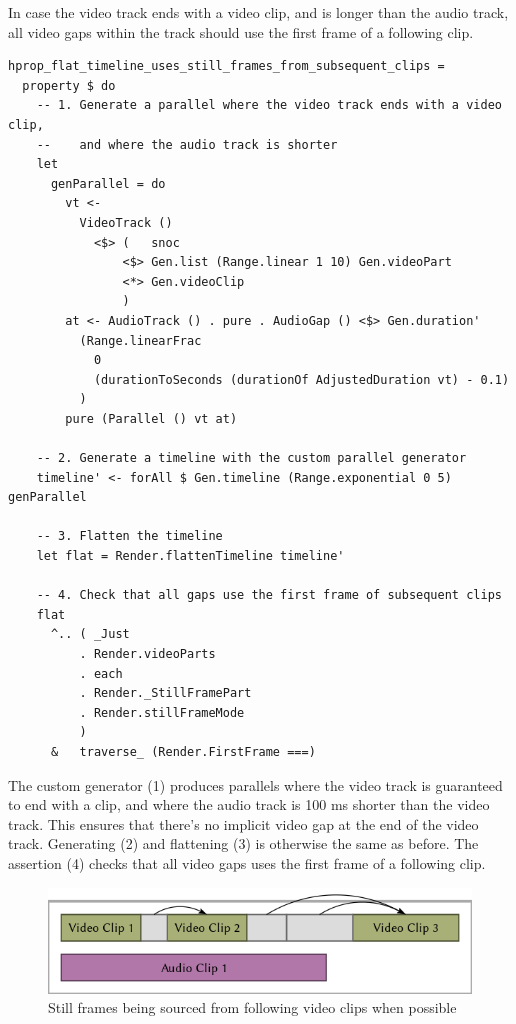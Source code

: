 In case the video track ends with a video clip, and is longer than the audio track, all video gaps within the track should use the first frame of a following clip.

\begin{verbatim}
hprop_flat_timeline_uses_still_frames_from_subsequent_clips =
  property $ do
    -- 1. Generate a parallel where the video track ends with a video clip,
    --    and where the audio track is shorter
    let
      genParallel = do
        vt <-
          VideoTrack ()
            <$> (   snoc
                <$> Gen.list (Range.linear 1 10) Gen.videoPart
                <*> Gen.videoClip
                )
        at <- AudioTrack () . pure . AudioGap () <$> Gen.duration'
          (Range.linearFrac
            0
            (durationToSeconds (durationOf AdjustedDuration vt) - 0.1)
          )
        pure (Parallel () vt at)
  
    -- 2. Generate a timeline with the custom parallel generator
    timeline' <- forAll $ Gen.timeline (Range.exponential 0 5) genParallel
  
    -- 3. Flatten the timeline
    let flat = Render.flattenTimeline timeline'
  
    -- 4. Check that all gaps use the first frame of subsequent clips
    flat
      ^.. ( _Just
          . Render.videoParts
          . each
          . Render._StillFramePart
          . Render.stillFrameMode
          )
      &   traverse_ (Render.FirstFrame ===)
\end{verbatim}
The custom generator (1) produces parallels where the video track is guaranteed to end with a clip, and where the audio track is 100 ms shorter than the video track. This ensures that there's no implicit video gap at the end of the video track. Generating (2) and flattening (3) is otherwise the same as before. The assertion (4) checks that all video gaps uses the first frame of a following clip.
\begin{figure}[htbp]
 \centering
 \includegraphics[width=.95\linewidth]{./pics/case1_9.png}
 \caption{Still frames being sourced from following video clips when possible}
 \label{fig:case1_9}
\end{figure}


